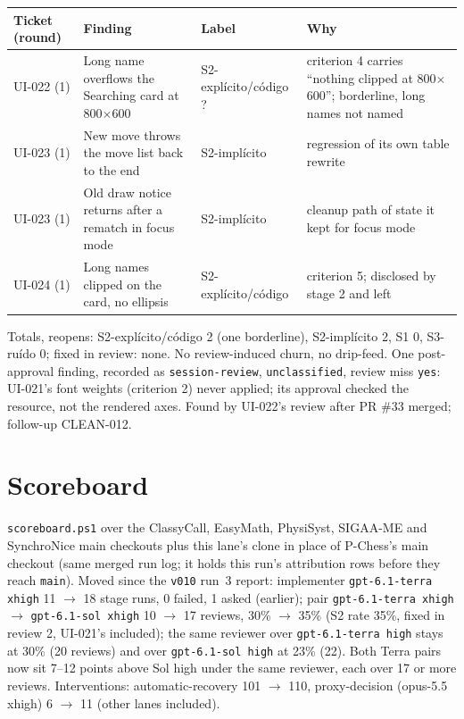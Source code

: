 \documentclass[11pt,a4paper]{article}
\begin{document}
{\small\noindent
\begin{tabularx}{\linewidth}{@{}>{\raggedright\arraybackslash}p{1.7cm}X>{\raggedright\arraybackslash}p{2.7cm}X@{}}
\toprule
Ticket (round) & Finding & Label & Why \\
\midrule
UI-022 (1) & Long name overflows the Searching card at 800$\times$600 & S2-explícito/\allowbreak código ? & criterion 4 carries ``nothing clipped at 800$\times$600''; borderline, long names not named \\
UI-023 (1) & New move throws the move list back to the end & S2-implícito & regression of its own table rewrite \\
UI-023 (1) & Old draw notice returns after a rematch in focus mode & S2-implícito & cleanup path of state it kept for focus mode \\
UI-024 (1) & Long names clipped on the card, no ellipsis & S2-explícito/\allowbreak código & criterion 5; disclosed by stage 2 and left \\
\bottomrule
\end{tabularx}
}

Totals, reopens: S2-explícito/código 2 (one borderline), S2-implícito 2, S1 0, S3-ruído 0;
fixed in review: none. No review-induced churn, no drip-feed. One post-approval finding, recorded
as \texttt{session-review}, \texttt{unclassified}, review miss \texttt{yes}: UI-021's font weights
(criterion 2) never applied; its approval checked the resource, not the rendered axes. Found by
UI-022's review after PR \#33 merged; follow-up CLEAN-012.

\section*{Scoreboard}

\texttt{scoreboard.ps1} over the ClassyCall, EasyMath, PhysiSyst, SIGAA-ME and SynchroNice main
checkouts plus this lane's clone in place of P-Chess's main checkout (same merged run log; it
holds this run's attribution rows before they reach \texttt{main}). Moved since the \texttt{v010}
run~3 report: implementer \texttt{gpt-6.1-terra xhigh} 11 $\to$ 18 stage runs, 0 failed, 1 asked
(earlier); pair \texttt{gpt-6.1-terra xhigh} $\rightarrow$ \texttt{gpt-6.1-sol xhigh} 10 $\to$ 17
reviews, 30\% $\to$ 35\% (S2 rate 35\%, fixed in review 2, UI-021's included); the same reviewer
over \texttt{gpt-6.1-terra high} stays at 30\% (20 reviews) and over \texttt{gpt-6.1-sol high} at
23\% (22). Both Terra pairs now sit 7--12 points above Sol high under the same reviewer, each over
17 or more reviews. Interventions: automatic-recovery 101 $\to$ 110, proxy-decision
(opus-5.5 xhigh) 6 $\to$ 11 (other lanes included).
\end{document}
